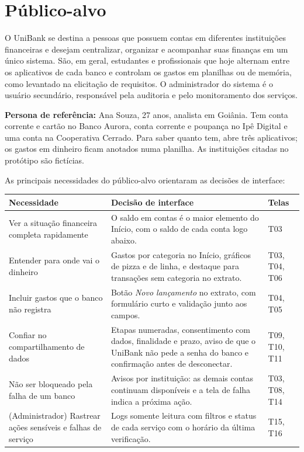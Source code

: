 \documentclass[11pt,a4paper]{article}
\newcommand{\hd}[1]{\cellcolor{headfill}\textbf{#1}}
\begin{document}
\section{Público-alvo}

O UniBank se destina a pessoas que possuem contas em diferentes instituições financeiras e desejam centralizar, organizar e acompanhar suas finanças em um único sistema. São, em geral, estudantes e profissionais que hoje alternam entre os aplicativos de cada banco e controlam os gastos em planilhas ou de memória, como levantado na elicitação de requisitos. O administrador do sistema é o usuário secundário, responsável pela auditoria e pelo monitoramento dos serviços.

\textbf{Persona de referência:} Ana Souza, 27 anos, analista em Goiânia. Tem conta corrente e cartão no Banco Aurora, conta corrente e poupança no Ipê Digital e uma conta na Cooperativa Cerrado. Para saber quanto tem, abre três aplicativos; os gastos em dinheiro ficam anotados numa planilha. As instituições citadas no protótipo são fictícias.

As principais necessidades do público-alvo orientaram as decisões de interface:

\begin{tabularx}{\linewidth}{|L{4.3cm}|Y|L{1.9cm}|}
\hline
\hd{Necessidade} & \hd{Decisão de interface} & \hd{Telas} \\ \hline
Ver a situação financeira completa rapidamente & O saldo em contas é o maior elemento do Início, com o saldo de cada conta logo abaixo. & T03 \\ \hline
Entender para onde vai o dinheiro & Gastos por categoria no Início, gráficos de pizza e de linha, e destaque para transações sem categoria no extrato. & T03, T04, T06 \\ \hline
Incluir gastos que o banco não registra & Botão \emph{Novo lançamento} no extrato, com formulário curto e validação junto aos campos. & T04, T05 \\ \hline
Confiar no compartilhamento de dados & Etapas numeradas, consentimento com dados, finalidade e prazo, aviso de que o UniBank não pede a senha do banco e confirmação antes de desconectar. & T09, T10, T11 \\ \hline
Não ser bloqueado pela falha de um banco & Avisos por instituição: as demais contas continuam disponíveis e a tela de falha indica a próxima ação. & T03, T08, T14 \\ \hline
(Administrador) Rastrear ações sensíveis e falhas de serviço & Logs somente leitura com filtros e status de cada serviço com o horário da última verificação. & T15, T16 \\ \hline
\end{tabularx}
\end{document}
